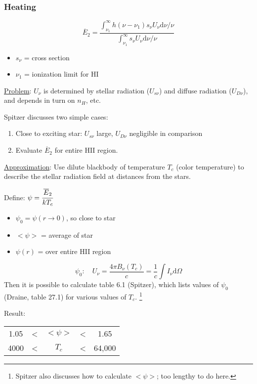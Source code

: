 \documentclass[12pt]{article}
\newcommand{\mar}[1]{\hspace{0pt}\marginpar{-\textcolor{black}{#1}-}}
\begin{document}
\subsubsection{Heating}
\[
    \overline{E}_{2} = \frac{
        \int_{\nu_{1}}^{\infty}{
            h(\nu-\nu_{1})s_{\nu}U_{\nu}\mathrm{d}\nu/\nu}}{
        \int_{\nu_{1}}^{\infty}{
            s_{\nu}U_{\nu}\mathrm{d}\nu/\nu}}
    \]
\begin{itemize}
    \item $s_{\nu}$ = cross section
    \item $\nu_{1}$ = ionization limit for HI
\end{itemize}

\underline{Problem}:
$U_{\nu}$ is determined by stellar radiation ($U_{s\nu}$) and
diffuse radiation ($U_{D\nu}$), and depends in turn on $n_{H}$, etc.

Spitzer discusses two simple cases:
\begin{enumerate}
    \item Close to exciting star: $U_{s\nu}$ large, $U_{D\nu}$ negligible
        in comparison
    \item Evaluate $\overline{E}_{2}$ for entire HII region.
\end{enumerate}

\underline{Approximation}:
Use dilute blackbody of temperature $T_{c}$ (color temperature)
to describe the stellar radiation field at distances from the stars.

Define: $\psi = \cfrac{\overline{E}_{2}}{kT_{c}}$
\begin{itemize}[label={}]
    \item $\psi_{0} = \psi(r\rightarrow 0)$, so close to star
    \item $<\psi>$ = average of star
    \item $\psi(r)$ = over entire HII region
\end{itemize}

\mar{155}
\[
    \psi_{0}:\quad U_{\nu} = \frac{4 \pi B_{\nu} (T_{c})}{c}
    = \frac{1}{c}\int{I_{\nu}\mathrm{d}\Omega}
    \]
Then it is possible to calculate table 6.1 (Spitzer), which lists values of
$\psi_{0}$ (Draine, table 27.1) for various values of $T_{c}$. \footnote{
    Spitzer also discusses how to calculate $<\psi>$; too lengthy to do here.
}

Result:
\begin{tabular}{c c c c c}
    1.05 & \textless & $<\psi>$ & \textless & 1.65\\
    4000 & \textless & $T_{c}$ & \textless & 64,000\\
\end{tabular}
\end{document}

